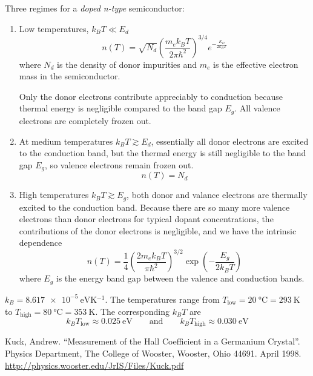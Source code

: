 \documentclass[11pt, a4paper]{article}
\newcommand{\eqtext}[1]{\qquad \text{#1} \qquad}
\begin{document}
Three regimes for a \textit{doped n-type} semiconductor:
\begin{enumerate}
	\item Low temperatures, $ k_{B}T \ll E_{d} $
	\begin{equation*}
		n(T) = \sqrt{N_{d}} \left(\frac{m_{e}k_{B}T}{2\pi \hbar^{2}}\right)^{3/4}e^{-\frac{E_{D}}{2k_{B}T}}
	\end{equation*}
	where $ N_{d} $ is the density of donor impurities and $ m_{e} $ is the effective electron mass in the semiconductor. 
	
	Only the donor electrons contribute appreciably to conduction because thermal energy is negligible compared to the band gap $ E_{g} $. All valence electrons are completely frozen out.
	
	\item At medium temperatures $ k_{B}T \gtrsim E_{d} $, essentially all donor electrons are excited to the conduction band, but the thermal energy is still negligible to the band gap $ E_{g} $, so valence electrons remain frozen out.
	\begin{equation*}
		n(T) = N_{d}
	\end{equation*}
	
	\item High temperatures $ k_{B}T \gtrsim E_{g} $, both donor and valance electrons are thermally excited to the conduction band. Because there are so many more valence electrons than donor electrons for typical dopant concentrations, the contributions of the donor electrons is negligible, and we have the intrinsic dependence
	\begin{equation*}
		n(T) = \frac{1}{4}\left(\frac{2m_{e}k_{B}T}{\pi \hbar^{2}}\right)^{3/2}\exp(-\frac{E_{g}}{2k_{B}T})
	\end{equation*}
	where $ E_{g} $ is the energy band gap between the valence and conduction bands.
\end{enumerate}

$ k_{B} = \SI{8.617e-5}{\electronvolt \kelvin^{-1}} $. The temperatures range from $ T_{\text{low}} = \SI{20}{\degreeCelsius} = \SI{293}{\kelvin}$ to $ T_{\text{high}} = \SI{80}{\degreeCelsius} = \SI{353}{\kelvin}$. The corresponding $ k_{B}T $ are
\begin{equation*}
	k_{B}T_{\text{low}} \approx \SI{0.025}{\electronvolt} \eqtext{and} k_{B}T_{\text{high}} \approx \SI{0.030}{\electronvolt}
\end{equation*}

\begin{thebibliography}{}
\setlength{\itemsep}{.2\itemsep}\setlength{\parsep}{.5\parsep}

 Kuck, Andrew. ``Measurement of the Hall Coefficient in a Germanium Crystal''. Physics Department, The College of Wooster, Wooster, Ohio 44691. April 1998. \url{http://physics.wooster.edu/JrIS/Files/Kuck.pdf}
 
\end{thebibliography}
\end{document}
